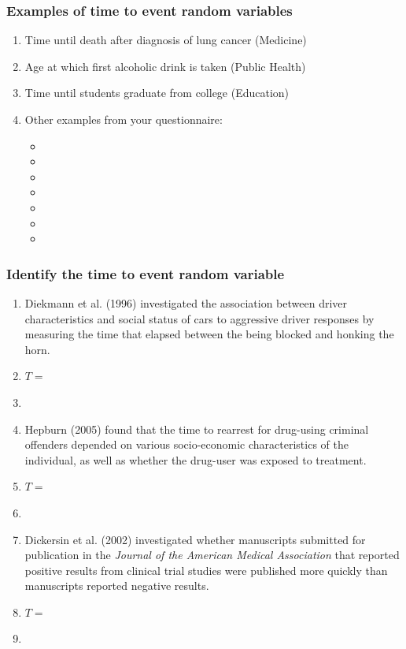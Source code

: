 \begin{frame}
\frametitle{Examples of time to event random variables}
\begin{enumerate}
\item Time until death after diagnosis of lung cancer (Medicine)
\item Age at which first alcoholic drink is taken (Public Health)
\item Time until students graduate from college (Education)
\item Other examples from your questionnaire:
\begin{itemize}
\item[]
\item %
\item[]
\item %
\item[]
\item %
\item[]
\end{itemize}
\end{enumerate}
\end{frame}

\begin{frame}
\frametitle{Identify the time to event random variable}
\begin{enumerate}
\item \small{Diekmann et al. (1996) investigated the association between driver characteristics and social status of cars to aggressive driver responses by measuring the time that elapsed between the being blocked and honking the horn.}
\item[] $T=$
\item[] %
\item \small{Hepburn (2005) found that the time to rearrest for drug-using criminal offenders depended on various socio-economic characteristics of the individual, as well as whether the drug-user was exposed to treatment.}
\item[] $T=$
\item[] %
\item \small{Dickersin et al. (2002) investigated whether manuscripts submitted for publication in the \textit{Journal of the American Medical Association} that reported positive results from clinical trial studies were published more quickly than manuscripts reported negative results.}
\item[] $T=$
\item[] %
\end{enumerate}
\end{frame}



